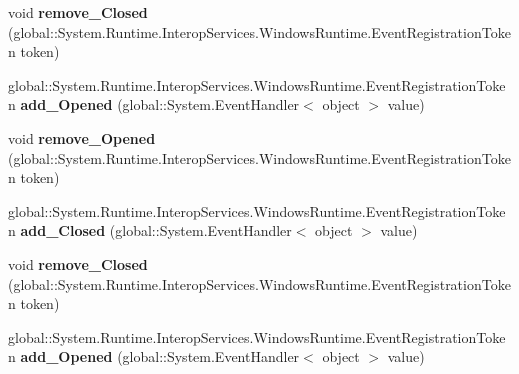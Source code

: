 \begin{DoxyCompactItemize}
\item 
\mbox{\label{interface_windows_1_1_u_i_1_1_xaml_1_1_controls_1_1_i_app_bar_a4d5a9d418800e1ab130394d9ff7e47eb}} 
void {\bfseries remove\+\_\+\+Closed} (global\+::\+System.\+Runtime.\+Interop\+Services.\+Windows\+Runtime.\+Event\+Registration\+Token token)
\item 
\mbox{\label{interface_windows_1_1_u_i_1_1_xaml_1_1_controls_1_1_i_app_bar_aecc047b50b36b80b2863330dfdd6b5b1}} 
global\+::\+System.\+Runtime.\+Interop\+Services.\+Windows\+Runtime.\+Event\+Registration\+Token {\bfseries add\+\_\+\+Opened} (global\+::\+System.\+Event\+Handler$<$ object $>$ value)
\item 
\mbox{\label{interface_windows_1_1_u_i_1_1_xaml_1_1_controls_1_1_i_app_bar_a7b13adf7eea94bab04ff42899a53893e}} 
void {\bfseries remove\+\_\+\+Opened} (global\+::\+System.\+Runtime.\+Interop\+Services.\+Windows\+Runtime.\+Event\+Registration\+Token token)
\item 
\mbox{\label{interface_windows_1_1_u_i_1_1_xaml_1_1_controls_1_1_i_app_bar_ab262c6a2bdf436106c956695a7b223cd}} 
global\+::\+System.\+Runtime.\+Interop\+Services.\+Windows\+Runtime.\+Event\+Registration\+Token {\bfseries add\+\_\+\+Closed} (global\+::\+System.\+Event\+Handler$<$ object $>$ value)
\item 
\mbox{\label{interface_windows_1_1_u_i_1_1_xaml_1_1_controls_1_1_i_app_bar_a4d5a9d418800e1ab130394d9ff7e47eb}} 
void {\bfseries remove\+\_\+\+Closed} (global\+::\+System.\+Runtime.\+Interop\+Services.\+Windows\+Runtime.\+Event\+Registration\+Token token)
\item 
\mbox{\label{interface_windows_1_1_u_i_1_1_xaml_1_1_controls_1_1_i_app_bar_aecc047b50b36b80b2863330dfdd6b5b1}} 
global\+::\+System.\+Runtime.\+Interop\+Services.\+Windows\+Runtime.\+Event\+Registration\+Token {\bfseries add\+\_\+\+Opened} (global\+::\+System.\+Event\+Handler$<$ object $>$ value)
\item 

\end{DoxyCompactItemize}
